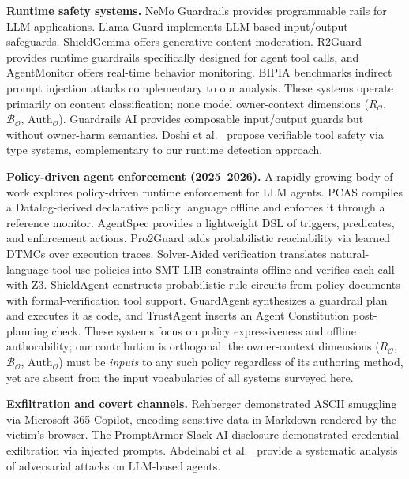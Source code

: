 \documentclass{article}
\theoremstyle{definition}
\newcommand{\BO}{\mathcal{B}_{\mathcal{O}}}
\newcommand{\RO}{R_{\mathcal{O}}}
\newcommand{\AuthO}{\text{Auth}_{\mathcal{O}}}
\begin{document}
\textbf{Runtime safety systems.} NeMo Guardrails \cite{rebedea2023nemoguardrails}
provides programmable rails for LLM applications. Llama Guard
\cite{inan2023llamaguard} implements LLM-based input/output safeguards.
ShieldGemma \cite{zeng2024shieldgemma} offers generative content moderation.
R2Guard \cite{chen2024r2guard} provides runtime guardrails specifically
designed for agent tool calls, and AgentMonitor \cite{yu2024agentmonitor}
offers real-time behavior monitoring. BIPIA \cite{yi2023bipia} benchmarks
indirect prompt injection attacks complementary to our analysis.
These systems operate primarily on content classification; none model
owner-context dimensions ($\RO$, $\BO$, $\AuthO$). Guardrails AI
\cite{guardrailsai2024} provides composable input/output guards but without
owner-harm semantics. Doshi et al.\ \cite{doshi2026verifiable} propose
verifiable tool safety via type systems, complementary to our runtime
detection approach.

\textbf{Policy-driven agent enforcement (2025--2026).} A rapidly growing
body of work explores policy-driven runtime enforcement for LLM agents.
PCAS \cite{palumbo2026pcas} compiles a Datalog-derived declarative
policy language offline and enforces it through a reference monitor.
AgentSpec \cite{wang2026agentspec} provides a lightweight DSL of
triggers, predicates, and enforcement actions. Pro2Guard
\cite{he2025pro2guard} adds probabilistic reachability via learned
DTMCs over execution traces. Solver-Aided verification
\cite{roy2026solveraided} translates natural-language tool-use policies
into SMT-LIB constraints offline and verifies each call with Z3.
ShieldAgent \cite{chen2025shieldagent} constructs probabilistic rule
circuits from policy documents with formal-verification tool support.
GuardAgent \cite{xiang2024guardagent} synthesizes a guardrail plan and
executes it as code, and TrustAgent \cite{hua2024trustagent} inserts
an Agent Constitution post-planning check. These systems focus on
policy expressiveness and offline authorability; our contribution is
orthogonal: the owner-context dimensions ($\RO$, $\BO$, $\AuthO$) must
be \emph{inputs} to any such policy regardless of its authoring method,
yet are absent from the input vocabularies of all systems surveyed here.

\textbf{Exfiltration and covert channels.} Rehberger \cite{rehberger2024copilot}
demonstrated ASCII smuggling via Microsoft 365 Copilot, encoding sensitive
data in Markdown rendered by the victim's browser. The PromptArmor Slack
AI disclosure \cite{promptarmor2024slack} demonstrated credential
exfiltration via injected prompts. Abdelnabi et al.\ \cite{abdelnabi2024llmagent}
provide a systematic analysis of adversarial attacks on LLM-based agents.
\end{document}

